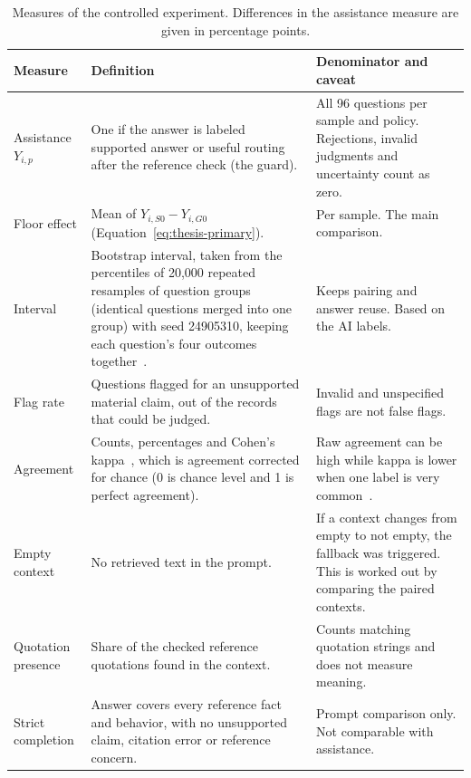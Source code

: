\begin{table}[htbp]
\centering\small
\caption[Measures of the controlled experiment]{Measures of the controlled experiment. Differences in the assistance measure are given in percentage points.}
\label{tab:metrics}
\begin{tabularx}{\linewidth}{>{\raggedright\arraybackslash}p{2.7cm}>{\raggedright\arraybackslash}X>{\raggedright\arraybackslash}X}
\toprule
Measure & Definition & Denominator and caveat \\
\midrule
Assistance $Y_{i,p}$ & One if the answer is labeled supported answer or useful routing after the reference check (the guard). & All 96 questions per sample and policy. Rejections, invalid judgments and uncertainty count as zero. \\
Floor effect & Mean of $Y_{i,S0}-Y_{i,G0}$ (Equation~\ref{eq:thesis-primary}). & Per sample. The main comparison. \\
Interval & Bootstrap interval, taken from the percentiles of 20,000 repeated resamples of question groups (identical questions merged into one group) with seed 24905310, keeping each question's four outcomes together~\cite{efron1993bootstrap}. & Keeps pairing and answer reuse. Based on the AI labels. \\
Flag rate & Questions flagged for an unsupported material claim, out of the records that could be judged. & Invalid and unspecified flags are not false flags. \\
Agreement & Counts, percentages and Cohen's kappa~\cite{cohen1960kappa}, which is agreement corrected for chance (0 is chance level and 1 is perfect agreement). & Raw agreement can be high while kappa is lower when one label is very common~\cite{feinstein1990kappa}. \\
Empty context & No retrieved text in the prompt. & If a context changes from empty to not empty, the fallback was triggered. This is worked out by comparing the paired contexts. \\
Quotation presence & Share of the checked reference quotations found in the context. & Counts matching quotation strings and does not measure meaning. \\
Strict completion & Answer covers every reference fact and behavior, with no unsupported claim, citation error or reference concern. & Prompt comparison only. Not comparable with assistance. \\
\bottomrule
\end{tabularx}
\end{table}

